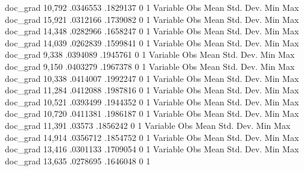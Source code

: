    doc_grad {\VBAR}     10,792    .0346553    .1829137          0          1
{\smallskip}
    Variable {\VBAR}        Obs        Mean    Std. Dev.       Min        Max
    doc_grad {\VBAR}     15,921    .0312166    .1739082          0          1
{\smallskip}
    Variable {\VBAR}        Obs        Mean    Std. Dev.       Min        Max
    doc_grad {\VBAR}     14,348    .0282966    .1658247          0          1
{\smallskip}
    Variable {\VBAR}        Obs        Mean    Std. Dev.       Min        Max
    doc_grad {\VBAR}     14,039    .0262839    .1599841          0          1
{\smallskip}
    Variable {\VBAR}        Obs        Mean    Std. Dev.       Min        Max
    doc_grad {\VBAR}      9,338    .0394089    .1945761          0          1
{\smallskip}
    Variable {\VBAR}        Obs        Mean    Std. Dev.       Min        Max
    doc_grad {\VBAR}      9,150    .0403279    .1967378          0          1
{\smallskip}
    Variable {\VBAR}        Obs        Mean    Std. Dev.       Min        Max
    doc_grad {\VBAR}     10,338    .0414007    .1992247          0          1
{\smallskip}
    Variable {\VBAR}        Obs        Mean    Std. Dev.       Min        Max
    doc_grad {\VBAR}     11,284    .0412088    .1987816          0          1
{\smallskip}
    Variable {\VBAR}        Obs        Mean    Std. Dev.       Min        Max
    doc_grad {\VBAR}     10,521    .0393499    .1944352          0          1
{\smallskip}
    Variable {\VBAR}        Obs        Mean    Std. Dev.       Min        Max
    doc_grad {\VBAR}     10,720    .0411381    .1986187          0          1
{\smallskip}
    Variable {\VBAR}        Obs        Mean    Std. Dev.       Min        Max
    doc_grad {\VBAR}     11,391      .03573    .1856242          0          1
{\smallskip}
    Variable {\VBAR}        Obs        Mean    Std. Dev.       Min        Max
    doc_grad {\VBAR}     14,914    .0356712    .1854752          0          1
{\smallskip}
    Variable {\VBAR}        Obs        Mean    Std. Dev.       Min        Max
    doc_grad {\VBAR}     13,416    .0301133    .1709054          0          1
{\smallskip}
    Variable {\VBAR}        Obs        Mean    Std. Dev.       Min        Max
    doc_grad {\VBAR}     13,635    .0278695    .1646048          0          1
